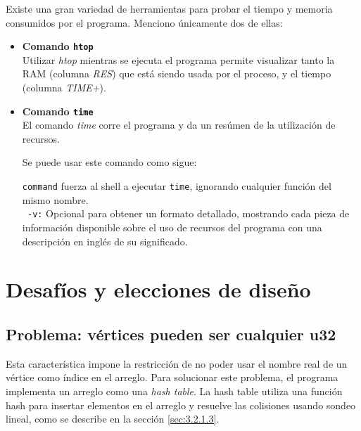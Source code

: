 \documentclass[11pt,a4paper]{article}
\theoremstyle{plain}
\begin{document}
Existe una gran variedad de herramientas para probar el tiempo y memoria consumidos por el programa. Menciono únicamente dos de ellas:\\
\begin{itemize}
\item\textbf{Comando \texttt{htop}}\\

 Utilizar \emph{htop} mientras se ejecuta el programa permite visualizar tanto la RAM (columna \emph{RES}) que está siendo usada por el proceso, y el tiempo (columna \emph{TIME+}).\\

\item\textbf{Comando \texttt{time}}\\

El comando \emph{time} corre el programa y da un resúmen de la utilización de recursos.

Se puede usar este comando como sigue:


\begin{quote}
\end{quote}

\texttt{command} fuerza al shell a ejecutar \texttt{time}, ignorando cualquier función del mismo nombre.\\

\texttt{ -v:} Opcional para obtener un formato detallado, mostrando cada pieza de información disponible sobre el uso de recursos del programa con una descripción en inglés de su significado.

\end{itemize}

\section{Desafíos y elecciones de diseño}

	\subsection{Problema: vértices pueden ser cualquier u32}

Esta característica impone la restricción de no poder usar el nombre real de un vértice como índice en el arreglo. Para solucionar este problema, el programa implementa un arreglo como una \emph{hash table}. La hash table utiliza una función hash para insertar elementos en el arreglo y resuelve las colisiones usando sondeo lineal, como se describe en la sección \ref{sec:3.2.1.3}.
\end{document}
